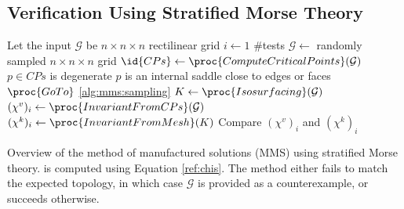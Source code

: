 \subsection{Verification Using Stratified Morse Theory}
\label{subsec:smt-verify}

\begin{algorithm}[t]
\begin{codebox}
\li \Comment Let the input $\mathcal{G}$ be $n \times n \times n$ rectilinear grid
\li \For $i \gets 1$ \To $\#$tests
\li     \Do $\mathcal{G} \gets$ randomly sampled $n \times n \times n$ grid \label{alg:mms:sampling}
\li         $\id{CPs} \gets \proc{ComputeCriticalPoints}(\mathcal{G})$
\li         \If $p \in CPs$ is degenerate 
\li		$p$ is an internal saddle close to edges or faces
\li         	\Then $\proc{GoTo}$ \ref{alg:mms:sampling} \label{alg:mms:goto-smt}
\li         \Else $K \gets \proc{Isosurfacing}(\mathcal{G})$
\li         	  $(\chi^v)_i \gets \proc{InvariantFromCPs}(\mathcal{G})$
\li         	  $(\chi^k)_i \gets \proc{InvariantFromMesh}(K)$
	    \End
\li Compare $(\chi^v)_i$ and $(\chi^k)_i$
      \End
\end{codebox}
\caption{\label{alg:manufactured-solutions-smt}Overview of the method of manufactured solutions (MMS) using
stratified Morse theory.  is computed using Equation
\eqref{ref:chis}. The method either fails to match the expected topology, in
which case $\mathcal{G}$ is provided as a counterexample, or
succeeds otherwise.}
\end{algorithm}


